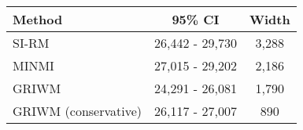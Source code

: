 
\begin{tabular}{lcc}
\toprule
Method & 95\% CI & Width\\
\midrule
SI-RM & 26,442 - 29,730 & 3,288\\
MINMI & 27,015 - 29,202 & 2,186\\
GRIWM & 24,291 - 26,081 & 1,790\\
GRIWM (conservative) & 26,117 - 27,007 & 890\\
\bottomrule
\end{tabular}
